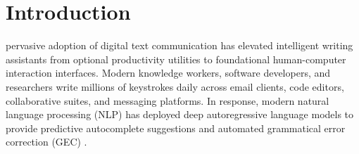 \documentclass[10pt,journal,compsoc]{IEEEtran}
\begin{document}
\maketitle
\thispagestyle{empty}
\IEEEdisplaynontitleabstractindextext
\IEEEpeerreviewmaketitle

\section{Introduction}
\label{sec:introduction}

 pervasive adoption of digital text communication has elevated intelligent writing assistants from optional productivity utilities to foundational human-computer interaction interfaces. Modern knowledge workers, software developers, and researchers write millions of keystrokes daily across email clients, code editors, collaborative suites, and messaging platforms. In response, modern natural language processing (NLP) has deployed deep autoregressive language models to provide predictive autocomplete suggestions and automated grammatical error correction (GEC) \cite{vaswani2017attention, devlin2018bert, raffel2020t5, brown2020language}. 
\end{document}
